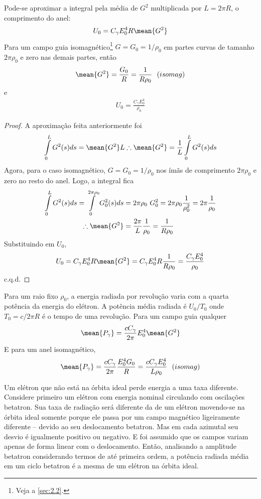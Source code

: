Pode-se aproximar a integral pela média de $G^2$ multiplicada por $L=2\pi R$, o comprimento do anel:
\begin{align}
	U_0 = C_\gamma E_0^4 R \mean{G^2}
\end{align}
Para um campo guia isomagnético\footnote{Veja a \autoref{sec:2.2}.} $G = G_0=1/\rho_0$ em partes curvas de tamanho $2\pi\rho_0$ e zero nas demais partes, então
\begin{align}
	\mean{G^2} = \frac{G_0}{R} = \frac{1}{R \rho_0}\ \ (isomag)
\end{align}
e
\begin{align}
	U_0 = \frac{C_\gamma E_0^4}{\rho_0}
\end{align}
\begin{proof}
	A aproximação feita anteriormente foi
	\begin{align*}
		\int\limits_{0}^{L}G^2(s)ds = \mean{G^2}L \therefore \mean{G^2} = \frac{1}{L}\int\limits_{0}^{L}G^2(s)ds
	\end{align*}
	Agora, para o caso isomagnético, $G=G_0=1/\rho_0$ nos ímãs de comprimento $2\pi \rho_0$ e zero no resto do anel. Logo, a integral fica
	\begin{align*}
		\int\limits_{0}^{L}G^2(s)ds = \int\limits_{0}^{2\pi\rho_0}G_0^2(s)ds &= 2\pi\rho_0\ G_0^2 = 2\pi\rho_0 \frac{1}{\rho_0^2} = 2\pi \frac{1}{\rho_0}\\
		\therefore \mean{G^2} &= \frac{2\pi}{L} \frac{1}{\rho_0} = \frac{1}{R \rho_0}
	\end{align*}
	Substituindo em $U_0$,
	\begin{align*}
		U_0 = C_\gamma E_0^4 R \mean{G^2} = C_\gamma E_0^4 R \frac{1}{R \rho_0} = \frac{C_\gamma E_0^4}{\rho_0}
	\end{align*}
	c.q.d.
\end{proof}

Para um raio fixo $\rho_0$, a energia radiada por revolução varia com a quarta potência da energia do elétron. A potência média radiada é $U_0/T_0$ onde $T_0 = c/2\pi R$ é o tempo de uma revolução. Para um campo guia qualquer
\begin{align}
	\mean{P_\gamma} = \frac{c C_\gamma}{2\pi} E_0^4 \mean{G^2}
\end{align} 
E para um anel isomagnético,
\begin{align}
	\mean{P_\gamma} = \frac{c C_\gamma}{2\pi}\frac{E_0^4 G_0}{R} = \frac{c C_\gamma E_0^4}{L \rho_0}\ \ (isomag)
\end{align}

Um elétron que não está na órbita ideal perde energia a uma taxa diferente. Considere primeiro um elétron com energia nominal circulando com oscilações betatron. Sua taxa de radiação será diferente da de um elétron movendo-se na órbita ideal somente porque ele passa por um campo magnético ligeiramente diferente -- devido ao seu deslocamento betatron. Mas em cada azimutal seu desvio é igualmente positivo ou negativo. E foi assumido que os campos variam apenas de forma linear com o deslocamento. Então, analisando a amplitude betatron considerando termos de até primeira ordem, a potência radiada média em um ciclo betatron é a mesma de um elétron na órbita ideal.

